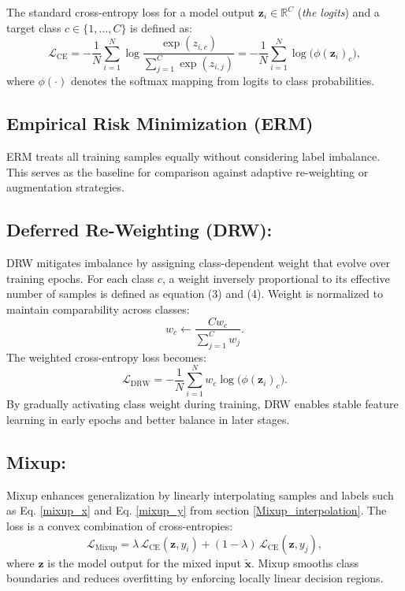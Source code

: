 \vspace{0.5em}
\noindent
The standard cross-entropy loss for a model output $\mathbf{z}_i \in \mathbb{R}^C$ (\textit{the logits}) and a target class $c \in \{1, \dots, C\}$ is defined as:
{\footnotesize
\begin{equation}
\mathcal{L}_{\mathrm{CE}}
= -\frac{1}{N} \sum_{i=1}^{N}
    \log \frac{\exp(z_{i, c})}{\sum_{j=1}^{C} \exp(z_{i, j})}
= -\frac{1}{N} \sum_{i=1}^{N}
    \log \big( \phi(\mathbf{z}_i)_{c} \big),
\end{equation}}
where $\phi(\cdot)$ denotes the softmax mapping from logits to class probabilities.

\subsection{Empirical Risk Minimization (ERM)}
ERM treats all training samples equally without considering label imbalance. This serves as the baseline for comparison against adaptive re-weighting or augmentation strategies.

\subsection{Deferred Re-Weighting (DRW):}
DRW mitigates imbalance by assigning class-dependent weight that evolve over training epochs.  
For each class $c$, a weight inversely proportional to its effective number of samples is defined as equation (3) and (4).
Weight is normalized to maintain comparability across classes:
\begin{equation}
w_c \leftarrow \frac{C w_c}{\sum_{j=1}^{C} w_j}.
\end{equation}
The weighted cross-entropy loss becomes:
\begin{equation}
\mathcal{L}_{\mathrm{DRW}}
= -\frac{1}{N} \sum_{i=1}^{N}
    w_{c} \log \big( \phi(\mathbf{z}_i)_{c} \big).
\end{equation}
By gradually activating class weight during training, DRW enables stable feature learning in early epochs and better balance in later stages.

\subsection{Mixup:}
Mixup enhances generalization by linearly interpolating samples and labels such as Eq. \eqref{mixup_x} and 
Eq. \eqref{mixup_y} from section \ref{Mixup_interpolation}.
The loss is a convex combination of cross-entropies:
\begin{equation}
\mathcal{L}_{\mathrm{Mixup}}
= \lambda \, \mathcal{L}_{\mathrm{CE}}(\mathbf{z}, y_i)
+ (1 - \lambda) \, \mathcal{L}_{\mathrm{CE}}(\mathbf{z}, y_j),
\end{equation}
where $\mathbf{z}$ is the model output for the mixed input $\tilde{\mathbf{x}}$.  
Mixup smooths class boundaries and reduces overfitting by enforcing locally linear decision regions.

